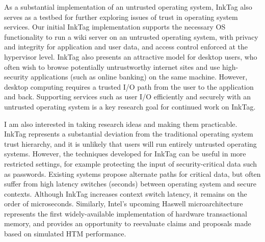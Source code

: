 \documentclass{article}
\newcommand{\inktag}{InkTag\xspace}
\begin{document}
As a substantial implementation of an untrusted operating system, \inktag
also serves as a testbed for further exploring issues of trust in operating
system services. Our initial \inktag implementation supports the necessary
OS functionality to run a wiki server on an untrusted operating system,
with privacy and integrity for application and user data, and access
control enforced at the hypervisor level. \inktag also presents an
attractive model for desktop users, who often wish to browse
potentially untrustworthy internet sites and use high-security applications
(such as online banking) on the same machine. However, desktop computing
requires a trusted I/O path from the user to the application and back.
Supporting services such as user I/O efficiently and securely with an
untrusted operating system is a key research goal for continued work on
\inktag.

I am also interested in taking research ideas and making them practicable.
\inktag represents a substantial deviation from the traditional operating
system trust hierarchy, and it is unlikely that users will run entirely
untrusted operating systems. However, the techniques developed for \inktag
can be useful in more restricted settings, for example protecting the input of
security-critical data such as passwords. Existing systems propose
alternate paths for critical data, but often suffer from high latency
switches (seconds) between operating system and secure contexts. Although
\inktag increases context switch latency, it remains on the order of
microseconds. Similarly, Intel's upcoming Haswell microarchitecture
represents the first widely-available implementation of hardware
transactional memory, and provides an opportunity to reevaluate claims and
proposals made based on simulated HTM performance.
\end{document}
